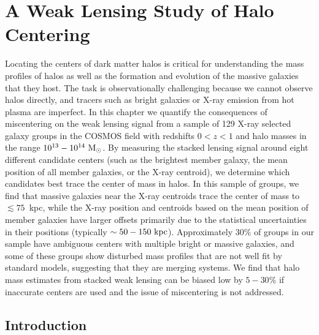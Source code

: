 \chapter{A Weak Lensing Study of Halo Centering}

\label{chap:centering}

  
  Locating the centers of dark matter halos is critical for
  understanding the mass profiles of halos as well as the formation and
  evolution of the massive galaxies that they host. The task is observationally
  challenging because we cannot observe halos directly, and tracers
  such as bright galaxies or X-ray emission from hot plasma are
  imperfect. In this chapter we quantify the consequences of miscentering on
  the weak lensing signal from a sample of 129 X-ray selected galaxy
  groups in the COSMOS field with redshifts $0<z<1$ and halo masses in
  the range $10^{13}-10^{14}~{\rm M_{\odot}}$. By measuring the
  stacked lensing signal around eight different candidate centers
  (such as the brightest member galaxy, the mean position of all
  member galaxies, or the X-ray centroid), we determine which
  candidates best trace the center of mass in halos. In this sample of
  groups, we find that massive galaxies near the X-ray centroids
  trace the center of mass to $\lesssim 75$~{\rm kpc}, while the X-ray 
  position and centroids based on the mean position of member galaxies
  have larger offsets primarily due to the statistical uncertainties in their
  positions (typically $\sim50-150~{\rm kpc}$). Approximately $30\%$ of
  groups in our sample have ambiguous centers with multiple bright or
  massive galaxies, and some of these groups show disturbed mass
  profiles that are not well fit by standard models, suggesting that
  they are merging systems. We find that halo mass estimates from stacked
  weak lensing can be biased low by $5-30\%$ if inaccurate centers are
  used and the issue of miscentering is not addressed. 

\section{Introduction}

